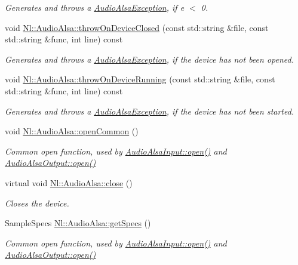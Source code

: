 \begin{DoxyCompactItemize}
\begin{DoxyCompactList}\small\item\em Generates and throws a \hyperlink{classNl_1_1AudioAlsaException}{Audio\-Alsa\-Exception}, if {\itshape e} $<$ 0. \end{DoxyCompactList}\item 
void \hyperlink{group__Audio_ga409e810baf7f4c3f1ff7380b1f979721}{Nl\-::\-Audio\-Alsa\-::throw\-On\-Device\-Closed} (const std\-::string \&file, const std\-::string \&func, int line) const 
\begin{DoxyCompactList}\small\item\em Generates and throws a \hyperlink{classNl_1_1AudioAlsaException}{Audio\-Alsa\-Exception}, if the device has not been opened. \end{DoxyCompactList}\item 
void \hyperlink{group__Audio_ga96f03f2ab93bf0caec1ca9dc9fc03d6b}{Nl\-::\-Audio\-Alsa\-::throw\-On\-Device\-Running} (const std\-::string \&file, const std\-::string \&func, int line) const 
\begin{DoxyCompactList}\small\item\em Generates and throws a \hyperlink{classNl_1_1AudioAlsaException}{Audio\-Alsa\-Exception}, if the device has not been started. \end{DoxyCompactList}\item 
void \hyperlink{group__Audio_ga412c7a2b30dfb3b1b49ce63b7e84eb52}{Nl\-::\-Audio\-Alsa\-::open\-Common} ()
\begin{DoxyCompactList}\small\item\em Common open function, used by \hyperlink{classNl_1_1AudioAlsaInput_a9e3afb8dfb0615d745a4f362302ce99d}{Audio\-Alsa\-Input\-::open()} and \hyperlink{classNl_1_1AudioAlsaOutput_a94792430810853353314a71f1b54a5d3}{Audio\-Alsa\-Output\-::open()} \end{DoxyCompactList}\item 
virtual void \hyperlink{group__Audio_ga99c454b8bb141a18f0ec39955550ca1e}{Nl\-::\-Audio\-Alsa\-::close} ()
\begin{DoxyCompactList}\small\item\em Closes the device. \end{DoxyCompactList}\item 
Sample\-Specs \hyperlink{group__Audio_gac48ddd5186e4c084dc1b7c7457ecb64a}{Nl\-::\-Audio\-Alsa\-::get\-Specs} ()
\begin{DoxyCompactList}\small\item\em Common open function, used by \hyperlink{classNl_1_1AudioAlsaInput_a9e3afb8dfb0615d745a4f362302ce99d}{Audio\-Alsa\-Input\-::open()} and \hyperlink{classNl_1_1AudioAlsaOutput_a94792430810853353314a71f1b54a5d3}{Audio\-Alsa\-Output\-::open()} \end{DoxyCompactList}\item 

\end{DoxyCompactItemize}

